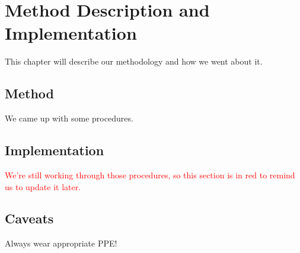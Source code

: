 \chapter{Method Description and Implementation}

This chapter will describe our methodology and how we went about it.

\section{Method}

We came up with some procedures.

\section{Implementation}

\textcolor{red}{We're still working through those procedures, so this section is in red
to remind us to update it later.}

\section{Caveats}

Always wear appropriate PPE!



